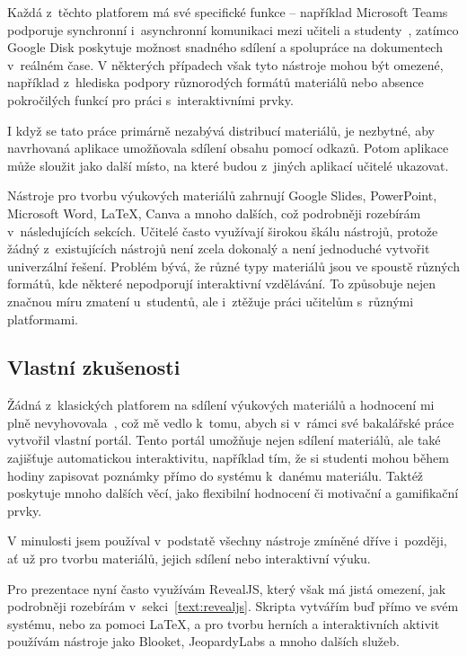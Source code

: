 Každá z~těchto platforem má své specifické funkce -- například Microsoft Teams podporuje synchronní i~asynchronní komunikaci mezi učiteli a studenty~\cite{teams}, zatímco Google Disk poskytuje možnost snadného sdílení a spolupráce na dokumentech v~reálném čase.
V některých případech však tyto nástroje mohou být omezené, například z~hlediska podpory různorodých formátů materiálů nebo absence pokročilých funkcí pro práci s~interaktivními prvky.

I když se tato práce primárně nezabývá distribucí materiálů, je nezbytné, aby navrhovaná aplikace umožňovala sdílení obsahu pomocí odkazů.
Potom aplikace může sloužit jako další místo, na které budou z~jiných aplikací učitelé ukazovat.

Nástroje pro tvorbu výukových materiálů zahrnují Google Slides, PowerPoint, Microsoft Word, \LaTeX, Canva a mnoho dalších, což podrobněji rozebírám v~následujících sekcích.
Učitelé často využívají širokou škálu nástrojů, protože žádný z~existujících nástrojů není zcela dokonalý a není jednoduché vytvořit univerzální řešení.
Problém bývá, že různé typy materiálů jsou ve spoustě různých formátů, kde některé nepodporují interaktivní vzdělávání.
To způsobuje nejen značnou míru zmatení u~studentů, ale i~ztěžuje práci učitelům s~různými platformami.

\subsection{Vlastní zkušenosti}

Žádná z~klasických platforem na sdílení výukových materiálů a hodnocení mi plně nevyhovovala~\cite{cajthaml_bp}, což mě vedlo k~tomu, abych si v~rámci své bakalářské práce vytvořil vlastní portál.
Tento portál umožňuje nejen sdílení materiálů, ale také zajišťuje automatickou interaktivitu, například tím, že si studenti mohou během hodiny zapisovat poznámky přímo do systému k~danému materiálu.
Taktéž poskytuje mnoho dalších věcí, jako flexibilní hodnocení či motivační a gamifikační prvky.

V minulosti jsem používal v~podstatě všechny nástroje zmíněné dříve i~později, ať už pro tvorbu materiálů, jejich sdílení nebo interaktivní výuku.

Pro prezentace nyní často využívám RevealJS, který však má jistá omezení, jak podrobněji rozebírám v~sekci~\ref{text:revealjs}.
Skripta vytvářím buď přímo ve svém systému, nebo za pomoci \LaTeX, a pro tvorbu herních a interaktivních aktivit používám nástroje jako Blooket, JeopardyLabs a mnoho dalších služeb.

